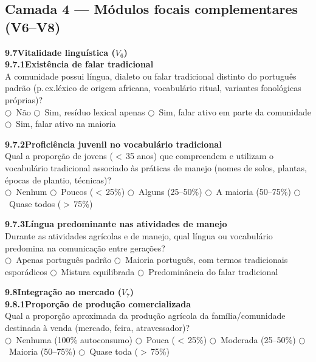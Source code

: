 \subsection{Camada 4 --- Módulos focais complementares (V6--V8)}

\medskip\noindent\textbf{9.7\quad Vitalidade linguística ($V_6$)}\\[6pt]

\noindent\textbf{9.7.1\quad Existência de falar tradicional}\\[2pt]
A comunidade possui língua, dialeto ou falar tradicional distinto do português padrão (p.\,ex.\@ léxico de origem africana, vocabulário ritual, variantes fonológicas próprias)?\\
$\bigcirc$~Não \quad $\bigcirc$~Sim, resíduo lexical apenas \quad $\bigcirc$~Sim, falar ativo em parte da comunidade \quad $\bigcirc$~Sim, falar ativo na maioria

\medskip\noindent\textbf{9.7.2\quad Proficiência juvenil no vocabulário tradicional}\\[2pt]
Qual a proporção de jovens ($<$\,35 anos) que compreendem e utilizam o vocabulário tradicional associado às práticas de manejo (nomes de solos, plantas, épocas de plantio, técnicas)?\\
$\bigcirc$~Nenhum \quad $\bigcirc$~Poucos ($<$\,25\%) \quad $\bigcirc$~Alguns (25--50\%) \quad $\bigcirc$~A maioria (50--75\%) \quad $\bigcirc$~Quase todos ($>$\,75\%)

\medskip\noindent\textbf{9.7.3\quad Língua predominante nas atividades de manejo}\\[2pt]
Durante as atividades agrícolas e de manejo, qual língua ou vocabulário predomina na comunicação entre gerações?\\
$\bigcirc$~Apenas português padrão \quad $\bigcirc$~Maioria português, com termos tradicionais esporádicos \quad $\bigcirc$~Mistura equilibrada \quad $\bigcirc$~Predominância do falar tradicional

\bigskip\noindent\textbf{9.8\quad Integração ao mercado ($V_7$)}\\[6pt]

\noindent\textbf{9.8.1\quad Proporção de produção comercializada}\\[2pt]
Qual a proporção aproximada da produção agrícola da família/comunidade destinada à venda (mercado, feira, atravessador)?\\
$\bigcirc$~Nenhuma (100\% autoconsumo) \quad $\bigcirc$~Pouca ($<$\,25\%) \quad $\bigcirc$~Moderada (25--50\%) \quad $\bigcirc$~Maioria (50--75\%) \quad $\bigcirc$~Quase toda ($>$\,75\%)


